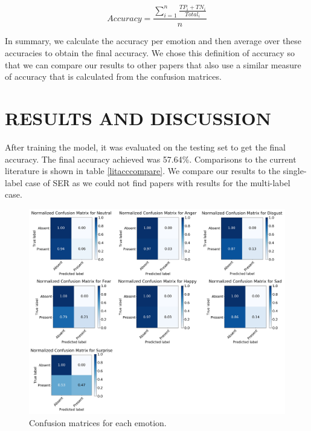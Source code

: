 \documentclass[a4paper, 10pt, conference]{ieeeconf}      %
\begin{document}
\begin{equation}
	\label{aveacc}
	Accuracy = \frac{\sum_{i=1}^{n}\frac{TP_{i} + TN_{i}}{Total_{i}}}{n}
\end{equation}

In summary, we calculate the accuracy per emotion and then average over these accuracies to obtain the final accuracy. We chose this definition of accuracy so that we can compare our results to other papers that also use a similar measure of accuracy that is calculated from the confusion matrices.

\addtolength{\textheight}{-3cm}   %


\section{RESULTS AND DISCUSSION}

After training the model, it was evaluated on the testing set to get the final accuracy. The final accuracy achieved was 57.64\%. Comparisons to the current literature is shown in table \ref{litacccompare}. We compare our results to the single-label case of SER as we could not find papers with results for the multi-label case.

\begin{figure}
	\centering
	\hspace{6mm}
	\includegraphics[width=\linewidth]{confusion_matrix.png}
	\caption{Confusion matrices for each emotion.}
	\label{confusionMatrix}
\end{figure}
\end{document}
